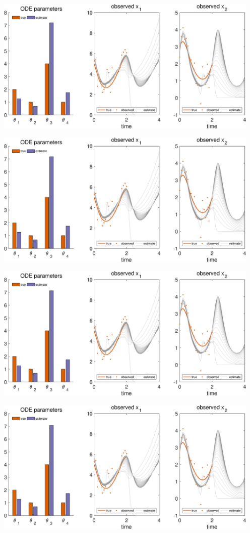 {\includegraphics [width=5in]{VGM_for_Lotka_Volterra_38.eps}

\includegraphics [width=5in]{VGM_for_Lotka_Volterra_39.eps}

\includegraphics [width=5in]{VGM_for_Lotka_Volterra_40.eps}

\includegraphics [width=5in]{VGM_for_Lotka_Volterra_41.eps}

}
\begin{par}

\end{par} \vspace{1em}

